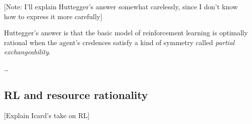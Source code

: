 [Note: I'll explain Huttegger's answer somewhat carelessly, since I don't know how to express it more carefully]

Huttegger's answer is that the basic model of reinforcement learning is optimally rational when the agent's credences satisfy a kind of symmetry called \emph{partial exchangeability}.

\dots

\subsection{RL and resource rationality}

[Explain Icard's take on RL]
